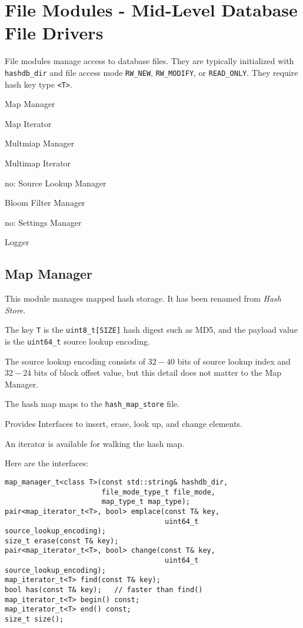 \documentclass[12pt,twoside]{article}
\begin{document}
\section{File Modules - Mid-Level Database File Drivers}
File modules manage access to database files.
They are typically initialized with \texttt{hashdb\_dir} and file access mode
\texttt{RW\_NEW}, \texttt{RW\_MODIFY}, or \texttt{READ\_ONLY}.
They require hash key type \texttt{<T>}.

\begin{compactitem}
\item Map Manager
\item Map Iterator
\item Multmiap Manager
\item Multimap Iterator
\item no: Source Lookup Manager
\item Bloom Filter Manager
\item no: Settings Manager
\item Logger
\end{compactitem}

\subsection{Map Manager}
This module manages mapped hash storage.
It has been renamed from \textit{Hash Store}.
\begin{compactitem}
\item The key \texttt{T} is the \texttt{uint8\_t[SIZE]} hash digest such as MD5,
and the payload value is the \texttt{uint64\_t} source lookup encoding.
\item The source lookup encoding consists of $32-40$ bits
of source lookup index and $32-24$ bits of block offset value,
but this detail does not matter to the Map Manager.
\item The hash map maps to the \texttt{hash\_map\_store} file.
\item Provides Interfaces to insert, erase, look up, and change elements.
\item An iterator is available for walking the hash map.
\end{compactitem}

Here are the interfaces:
\begin{small}
\begin{verbatim}
map_manager_t<class T>(const std::string& hashdb_dir,
                       file_mode_type_t file_mode,
                       map_type_t map_type);
pair<map_iterator_t<T>, bool> emplace(const T& key,
                                      uint64_t source_lookup_encoding);
size_t erase(const T& key);
pair<map_iterator_t<T>, bool> change(const T& key,
                                      uint64_t source_lookup_encoding);
map_iterator_t<T> find(const T& key);
bool has(const T& key);   // faster than find()
map_iterator_t<T> begin() const;
map_iterator_t<T> end() const;
size_t size();
\end{verbatim}
\end{small}
\end{document}
